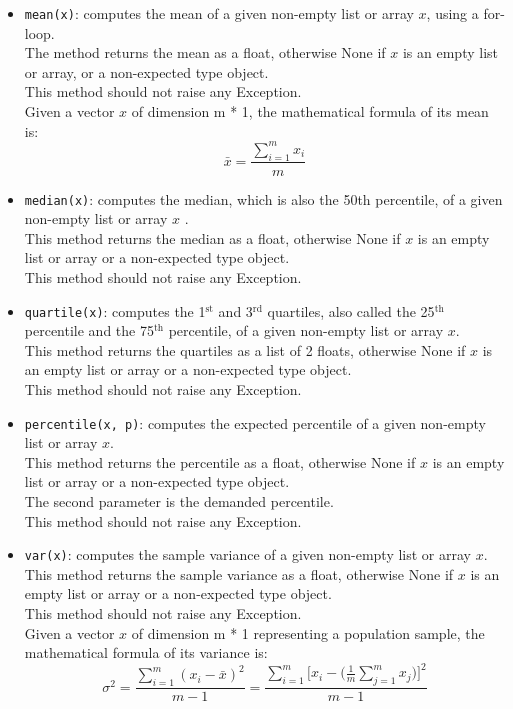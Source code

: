 \begin{itemize}
  \item \texttt{mean(x)}: computes the mean of a given non-empty list or array $x$, using a for-loop.\\
        The method returns the mean as a float, otherwise None if $x$ is an empty list or array,
        or a non-expected type object.\\
        This method should not raise any Exception.\\
        \newline
        Given a vector $x$ of dimension m * 1, the mathematical formula of its mean is:
        $$
        \bar{x} = \frac{\sum_{i = 1}^{m}{x_i}}{m}
        $$

  \item \texttt{median(x)}: computes the median, which is also the 50th percentile, of a given non-empty list or array $x$ .\\
        This method returns the median as a float,
        otherwise None if $x$ is an empty list or array or a non-expected type object.\\
        This method should not raise any Exception.\\

  \item \texttt{quartile(x)}: computes the 1$^\text{st}$ and 3$^\text{rd}$ quartiles,
        also called the 25$^\text{th}$ percentile and the 75$^\text{th}$ percentile, of a given non-empty list or array $x$.\\
        This method returns the quartiles as a list of 2 floats,
        otherwise None if $x$ is an empty list or array or a non-expected type object.\\
        This method should not raise any Exception.\\

  \item \texttt{percentile(x, p)}: computes the expected percentile of a given non-empty list or array $x$.\\
        This method returns the percentile as a float,
        otherwise None if $x$ is an empty list or array or a non-expected type object.\\
        The second parameter is the demanded percentile.\\
        This method should not raise any Exception.\\

  \item \texttt{var(x)}: computes the sample variance of a given non-empty list or array $x$.\\
        This method returns the sample variance as a float,
        otherwise None if $x$ is an empty list or array or a non-expected type object.\\
        This method should not raise any Exception.\\
        \newline
        Given a vector $x$ of dimension m * 1 representing a population sample, the mathematical formula of its variance is:
        $$
        \sigma^2 = \frac{\sum_{i = 1}^{m}{(x_i - \bar{x})^2}}{m - 1} = \frac{\sum_{i = 1}^{m}{[x_i - (\frac{1}{m}\sum_{j = 1}^{m}{x_j}})]^2}{m - 1}
        $$


\end{itemize}

